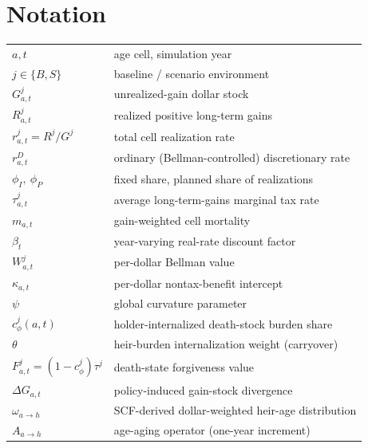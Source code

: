 \documentclass[11pt]{article}
\begin{document}
\appendix

\section{Notation}
\label{app:notation}

\begin{tabular}{ll}
\toprule
$a, t$                     & age cell, simulation year                              \\
$j \in \{B, S\}$           & baseline / scenario environment                        \\
$G^j_{a,t}$                & unrealized-gain dollar stock                           \\
$R^j_{a,t}$                & realized positive long-term gains                      \\
$r^j_{a,t} = R^j/G^j$      & total cell realization rate                            \\
$r^D_{a,t}$                & ordinary (Bellman-controlled) discretionary rate       \\
$\phi_I,\ \phi_P$          & fixed share, planned share of realizations             \\
$\tau^j_{a,t}$             & average long-term-gains marginal tax rate              \\
$m_{a,t}$                  & gain-weighted cell mortality                           \\
$\beta_t$                  & year-varying real-rate discount factor                 \\
$W^j_{a,t}$                & per-dollar Bellman value                               \\
$\kappa_{a,t}$             & per-dollar nontax-benefit intercept                    \\
$\psi$                     & global curvature parameter                             \\
$c_\phi^j(a,t)$            & holder-internalized death-stock burden share           \\
$\theta$                   & heir-burden internalization weight (carryover)         \\
$F^j_{a,t}=(1-c_\phi^j)\tau^j$ & death-state forgiveness value                      \\
$\Delta G_{a,t}$           & policy-induced gain-stock divergence                   \\
$\omega_{a\to h}$          & SCF-derived dollar-weighted heir-age distribution      \\
$A_{a\to h}$               & age-aging operator (one-year increment)                \\
\bottomrule
\end{tabular}
\end{document}
